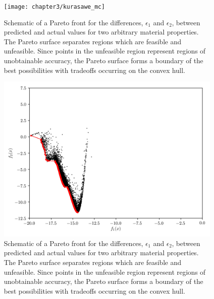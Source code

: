 \begin{figure}[h]
	\centering
  \texttt{[image: chapter3/kurasawe\_mc]}
  \caption{Schematic of a Pareto front for the differences, $\epsilon_1$ and $\epsilon_2$, between predicted and actual values for two arbitrary material properties.  The Pareto surface separates regions which are feasible and unfeasible.  Since points in the unfeasible region represent regions of unobtainable accuracy, the Pareto surface forms a boundary of the best possibilities with tradeoffs occurring on the convex hull. }
  \label{fig:kurasawe_mc}
\end{figure}

\begin{figure}[h]
	\centering
  \includegraphics{chapter3/kurasawe_kde}
  \caption{Schematic of a Pareto front for the differences, $\epsilon_1$ and $\epsilon_2$, between predicted and actual values for two arbitrary material properties.  The Pareto surface separates regions which are feasible and unfeasible.  Since points in the unfeasible region represent regions of unobtainable accuracy, the Pareto surface forms a boundary of the best possibilities with tradeoffs occurring on the convex hull. }
  \label{fig:pareto_convex}
\end{figure}

